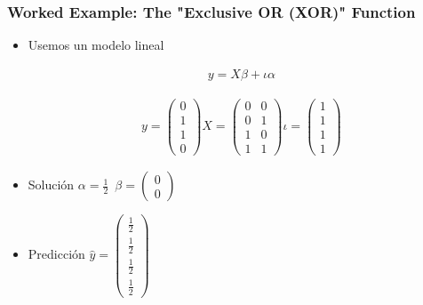 \documentclass[
  shownotes,
  xcolor={svgnames},
  hyperref={colorlinks,citecolor=DarkBlue,linkcolor=DarkRed,urlcolor=DarkBlue}
  , aspectratio=169]{beamer}
\begin{document}
\begin{frame}
\frametitle{Worked Example: The "Exclusive OR (XOR)" Function}

\begin{itemize}
\item Usemos un modelo lineal 

\begin{align}
y = X\beta + \iota \alpha 
\end{align}


 \begin{align}
 y=\left(\begin{array}{c}
0\\
1\\
1\\
0
\end{array}\right)X=\left(\begin{array}{cc}
0 & 0\\
0 &1\\
1 & 0\\
1 & 1
\end{array}\right)\iota=\left(\begin{array}{c}
1\\
1\\
1\\
1
\end{array}\right)
 \end{align}

\item Solución $ \alpha=\frac{1}{2} \,\,\,\beta=\left(\begin{array}{c}
0\\
0
\end{array}\right)
$


\item Predicción $\hat{y}=\left(\begin{array}{c}
\frac{1}{2}\\
\frac{1}{2}\\
\frac{1}{2}\\
\frac{1}{2}
\end{array}\right)$
\end{itemize}


\end{frame}
\end{document}

